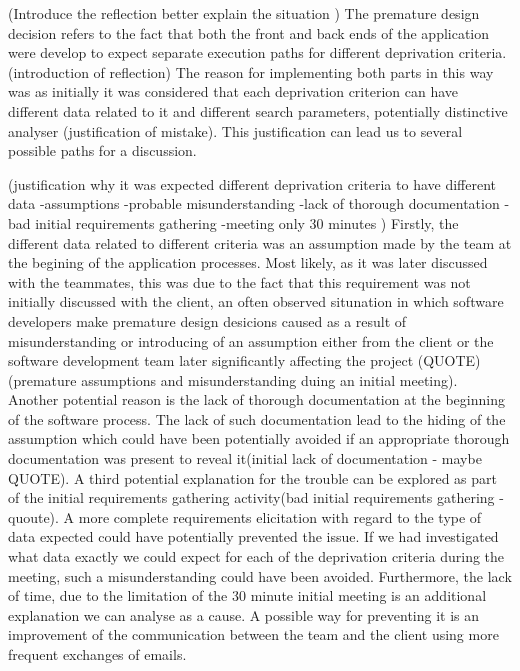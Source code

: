 \documentclass{l3proj}
\begin{document}
(Introduce the reflection better explain the situation )
The premature design decision refers to the fact that both the front and back ends of the application were develop to expect separate execution paths for different deprivation criteria.(introduction of reflection) The reason for implementing both parts in this way was as initially it was considered that each deprivation criterion can have different data related to it and different search parameters, potentially distinctive analyser (justification of mistake). This justification can lead us to several possible paths for a  discussion.

(justification why  it was expected different deprivation criteria to have different data
-assumptions
-probable misunderstanding
-lack of thorough documentation
-bad initial requirements gathering
-meeting only 30 minutes
)
Firstly, the different data related to different criteria was an assumption made by the team at the begining of the application processes. Most likely, as it was later discussed with the teammates, this was due to the fact that this requirement was not initially discussed with the client, an often observed situnation in which software developers make premature design desicions caused as a result of misunderstanding or introducing of an assumption either from the client or the software development team later significantly affecting the project (QUOTE)(premature assumptions and misunderstanding duing an initial meeting). Another potential reason is the lack of thorough documentation at the beginning of the software process. The lack of such documentation lead to the hiding of the assumption which could have been potentially avoided if an appropriate thorough documentation was present to reveal it(initial lack of documentation - maybe QUOTE). A third potential explanation for the trouble can be explored as part of the initial requirements gathering activity(bad initial requirements gathering - quoute). A more complete requirements elicitation with regard to the type of data expected could have potentially prevented the issue. If we had investigated what data exactly we could expect for each of the deprivation criteria during the meeting, such a misunderstanding could have been avoided. Furthermore, the lack of time, due to the limitation of the 30 minute initial meeting is an additional explanation we can analyse as a cause. A possible way for preventing it is an improvement of the communication between the team and the client using more frequent exchanges of emails.
\end{document}
